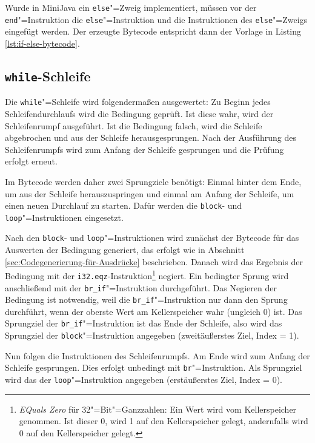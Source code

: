 Wurde in MiniJava ein \lstinline{else}"=Zweig implementiert, müssen vor der \lstinline{end}"=Instruktion die \lstinline{else}"=Instruktion und die Instruktionen des \lstinline{else}"=Zweigs eingefügt werden. Der erzeugte Bytecode entspricht dann der Vorlage in Listing \ref{lst:if-else-bytecode}.



\subsection{\lstinline{while}-Schleife}

Die \lstinline{while}"=Schleife wird folgendermaßen ausgewertet: Zu Beginn jedes Schleifendurchlaufs wird die Bedingung geprüft. Ist diese wahr, wird der Schleifenrumpf ausgeführt. Ist die Bedingung falsch, wird die Schleife abgebrochen und aus der Schleife herausgesprungen. Nach der Ausführung des Schleifenrumpfs wird zum Anfang der Schleife gesprungen und die Prüfung erfolgt erneut.

Im Bytecode werden daher zwei Sprungziele benötigt: Einmal hinter dem Ende, um aus der Schleife herauszuspringen und einmal am Anfang der Schleife, um einen neuen Durchlauf zu starten. Dafür werden die \lstinline{block}- und \lstinline{loop}"=Instruktionen eingesetzt.

Nach den \lstinline{block}- und \lstinline{loop}"=Instruktionen wird zunächst der Bytecode für das Auswerten der Bedingung generiert, das erfolgt wie in Abschnitt \ref{sec:Codegenerierung-für-Ausdrücke} beschrieben. Danach wird das Ergebnis der Bedingung mit der \lstinline{i32.eqz}-Instruktion\footnote{\emph{EQuals Zero} für 32"=Bit"=Ganzzahlen: Ein Wert wird vom Kellerspeicher genommen. Ist dieser 0, wird 1 auf den Kellerspeicher gelegt, andernfalls wird 0 auf den Kellerspeicher gelegt.} negiert. Ein bedingter Sprung wird anschließend mit der \lstinline{br_if}"=Instruktion durchgeführt. Das Negieren der Bedingung ist notwendig, weil die \lstinline{br_if}"=Instruktion nur dann den Sprung durchführt, wenn der oberste Wert am Kellerspeicher wahr (ungleich 0) ist. Das Sprungziel der \lstinline{br_if}"=Instruktion ist das Ende der Schleife, also wird das Sprungziel der \lstinline{block}"=Instruktion angegeben (zweitäußerstes Ziel, Index = 1).

Nun folgen die Instruktionen des Schleifenrumpfs. Am Ende wird zum Anfang der Schleife gesprungen. Dies erfolgt unbedingt mit \lstinline{br}"=Instruktion. Als Sprungziel wird das der \lstinline{loop}"=Instruktion angegeben (erstäußerstes Ziel, Index = 0).

